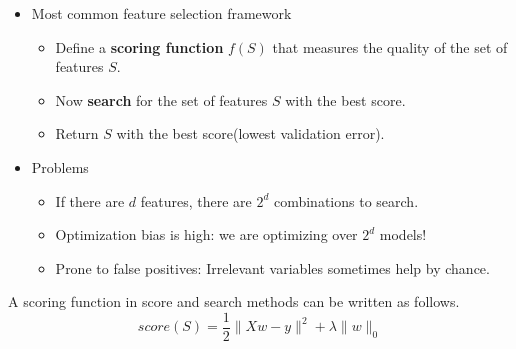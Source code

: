 \documentclass[]{article}
\providecommand{\tightlist}{%
  \setlength{\itemsep}{0pt}\setlength{\parskip}{0pt}}
\begin{document}
\begin{itemize}
\tightlist
\item
  Most common feature selection framework

  \begin{itemize}
  \tightlist
  \item
    Define a \textbf{scoring function} \(f(S)\) that measures the
    quality of the set of features \(S\).\\
  \item
    Now \textbf{search} for the set of features \(S\) with the best
    score.\\
  \item
    Return \(S\) with the best score(lowest validation error).\\
  \end{itemize}
\item
  Problems

  \begin{itemize}
  \tightlist
  \item
    If there are \(d\) features, there are \(2^d\) combinations to
    search.\\
  \item
    Optimization bias is high: we are optimizing over \(2^d\) models!\\
  \item
    Prone to false positives: Irrelevant variables sometimes help by
    chance.
  \end{itemize}
\end{itemize}

A scoring function in score and search methods can be written as
follows.
\[ score(S) = \frac{1}{2}\lVert{Xw -y}\rVert^2 + \lambda \lVert w\rVert_0\]
\end{document}
